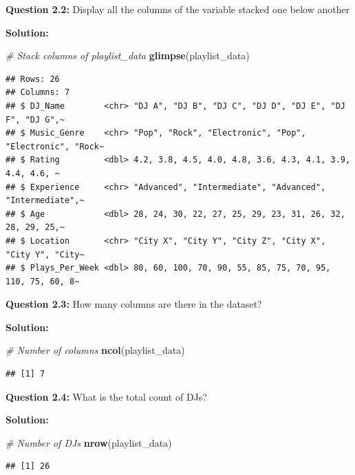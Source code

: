 \documentclass[
]{article}
\newenvironment{Shaded}{\begin{snugshade}}{\end{snugshade}}
\newcommand{\CommentTok}[1]{\textcolor[rgb]{0.56,0.35,0.01}{\textit{#1}}}
\newcommand{\FunctionTok}[1]{\textcolor[rgb]{0.13,0.29,0.53}{\textbf{#1}}}
\newcommand{\NormalTok}[1]{#1}
\begin{document}
\textbf{Question 2.2:} Display all the columns of the variable stacked
one below another

\textbf{Solution:}

\begin{Shaded}
\begin{Highlighting}[]
\CommentTok{\# Stack columns of playlist\_data}
\FunctionTok{glimpse}\NormalTok{(playlist\_data)}
\end{Highlighting}
\end{Shaded}

\begin{verbatim}
## Rows: 26
## Columns: 7
## $ DJ_Name        <chr> "DJ A", "DJ B", "DJ C", "DJ D", "DJ E", "DJ F", "DJ G",~
## $ Music_Genre    <chr> "Pop", "Rock", "Electronic", "Pop", "Electronic", "Rock~
## $ Rating         <dbl> 4.2, 3.8, 4.5, 4.0, 4.8, 3.6, 4.3, 4.1, 3.9, 4.4, 4.6, ~
## $ Experience     <chr> "Advanced", "Intermediate", "Advanced", "Intermediate",~
## $ Age            <dbl> 28, 24, 30, 22, 27, 25, 29, 23, 31, 26, 32, 28, 29, 25,~
## $ Location       <chr> "City X", "City Y", "City Z", "City X", "City Y", "City~
## $ Plays_Per_Week <dbl> 80, 60, 100, 70, 90, 55, 85, 75, 70, 95, 110, 75, 60, 8~
\end{verbatim}

\textbf{Question 2.3:} How many columns are there in the dataset?

\textbf{Solution:}

\begin{Shaded}
\begin{Highlighting}[]
\CommentTok{\# Number of columns}
\FunctionTok{ncol}\NormalTok{(playlist\_data)}
\end{Highlighting}
\end{Shaded}

\begin{verbatim}
## [1] 7
\end{verbatim}

\textbf{Question 2.4:} What is the total count of DJs?

\textbf{Solution:}

\begin{Shaded}
\begin{Highlighting}[]
\CommentTok{\# Number of DJs}
\FunctionTok{nrow}\NormalTok{(playlist\_data)}
\end{Highlighting}
\end{Shaded}

\begin{verbatim}
## [1] 26
\end{verbatim}
\end{document}
